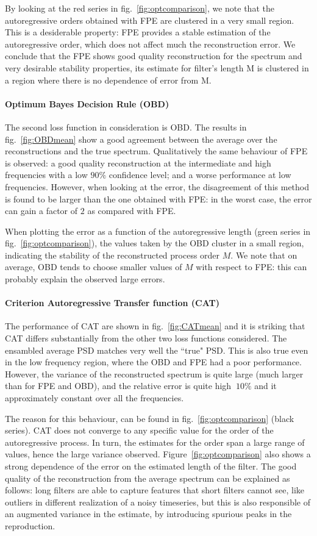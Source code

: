 \documentclass[twocolumn,showpacs,preprintnumbers,nofootinbib,prd,
superscriptaddress,10pt]{revtex4-1}
\begin{document}
By looking at the red series in fig.~\ref{fig:optcomparison}, we note that the autoregressive orders obtained with FPE are clustered in a very small region. This is a desiderable property: FPE provides a stable estimation of the autoregressive order, which does not affect much the reconstruction error.
We conclude that the FPE shows good quality reconstruction for the spectrum and very desirable stability properties, its estimate for filter's length M is clustered in a region where there is no dependence of error from M. 
\paragraph{Optimum Bayes Decision Rule (OBD)}
The second loss function in consideration is OBD.
The results in fig.~\ref{fig:OBDmean} show a good agreement between the average over the reconstructions and the true spectrum.
Qualitatively the same behaviour of FPE is observed: a good quality reconstruction at the intermediate and high frequencies with a low $90\%$ confidence level; and a worse performance at low frequencies.
However, when looking at the error, the disagreement of this method is found to be larger than the one obtained with FPE: in the worst case, the error can gain a factor of $2$ as compared with FPE. 

When plotting the error as a function of the autoregressive length (green series in fig.~\ref{fig:optcomparison}), the values taken by the OBD cluster in a small region, indicating the stability of the reconstructed process order $M$. We note that on average, OBD tends to choose smaller values of $M$ with respect to FPE: this can probably explain the observed large errors.

\paragraph{Criterion Autoregressive Transfer function (CAT)}
The performance of CAT are shown in fig.~\ref{fig:CATmean} and it is striking that CAT differs substantially from the other two loss functions considered.
The ensambled average PSD matches very well the ``true" PSD. This is also true even in the low frequency region, where the OBD and FPE had a poor performance.
However, the variance of the reconstructed spectrum is quite large (much larger than for FPE and OBD), and the relative error is quite high $~10\%$ and it approximately constant over all the frequencies.

The reason for this behaviour, can be found in fig.~\ref{fig:optcomparison} (black series). CAT does not converge to any specific value for the order of the autoregressive process.
In turn, the estimates for the order span a large range of values, hence the large variance observed.
Figure~\ref{fig:optcomparison} also shows a strong dependence of the error on the estimated length of the filter. The good quality of the reconstruction from the average spectrum can be explained as follows: long filters are able to capture features that short filters cannot see, like outliers in different realization of a noisy timeseries, but this is also responsible of an augmented variance in the estimate, by introducing spurious peaks in the reproduction.
\end{document}
